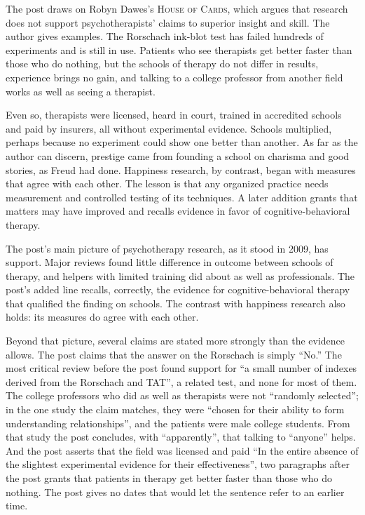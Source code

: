 \begin{afterword}
\summaryhead

The post draws on Robyn Dawes's \textsc{House of Cards}, which argues that research does not support psychotherapists' claims to superior insight and skill. The author gives examples. The Rorschach ink-blot test has failed hundreds of experiments and is still in use. Patients who see therapists get better faster than those who do nothing, but the schools of therapy do not differ in results, experience brings no gain, and talking to a college professor from another field works as well as seeing a therapist.

Even so, therapists were licensed, heard in court, trained in accredited schools and paid by insurers, all without experimental evidence. Schools multiplied, perhaps because no experiment could show one better than another. As far as the author can discern, prestige came from founding a school on charisma and good stories, as Freud had done. Happiness research, by contrast, began with measures that agree with each other. The lesson is that any organized practice needs measurement and controlled testing of its techniques. A later addition grants that matters may have improved and recalls evidence in favor of cognitive-behavioral therapy.

\responsehead

The post's main picture of psychotherapy research, as it stood in 2009, has support. Major reviews found little difference in outcome between schools of therapy, and helpers with limited training did about as well as professionals. The post's added line recalls, correctly, the evidence for cognitive-behavioral therapy that qualified the finding on schools. The contrast with happiness research also holds: its measures do agree with each other.

Beyond that picture, several claims are stated more strongly than the evidence allows. The post claims that the answer on the Rorschach is simply ``No.'' The most critical review before the post found support for ``a small number of indexes derived from the Rorschach and TAT'', a related test, and none for most of them. The college professors who did as well as therapists were not ``randomly selected''; in the one study the claim matches, they were ``chosen for their ability to form understanding relationships'', and the patients were male college students. From that study the post concludes, with ``apparently'', that talking to ``anyone'' helps. And the post asserts that the field was licensed and paid ``In the entire absence of the slightest experimental evidence for their effectiveness'', two paragraphs after the post grants that patients in therapy get better faster than those who do nothing. The post gives no dates that would let the sentence refer to an earlier time.


\end{afterword}
